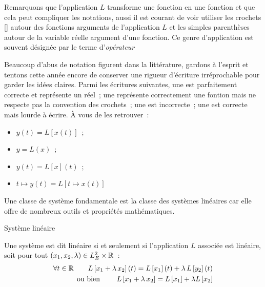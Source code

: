 	\begin{remarque}{}
          Remarquons que l'application $L$ transforme une fonction en
          une fonction et que cela peut compliquer les notations,
          aussi il est courant de voir utiliser les crochets [] autour
          des fonctions arguments de l'application $L$ et les simples
          parenthèses autour de la variable réelle argument d'une
          fonction. Ce genre d'application est souvent désignée par le
          terme d'\emph{opérateur}

        
          Beaucoup d'abus de notation figurent dans la littérature,
          gardons à l'esprit et tentons cette année encore de
          conserver une rigueur d'écriture irréprochable pour garder
          les idées claires. Parmi les écritures suivantes, une est
          parfaitement correcte et représente un réel~; une représente
          correctement une fontion mais ne respecte pas la convention
          des crochets~; une est incorrecte~; une est correcte mais
          lourde à écrire. À vous de les retrouver~:
          \begin{itemize}
          \item $y(t) = L[x(t)]$~;
          \item $y = L(x)$~;
          \item $y(t) = L[x](t)$~;
          \item $t\mapsto y(t) = L[t\mapsto x(t)]$
          \end{itemize}{}
	\end{remarque}
	
	Une classe de système fondamentale est la classe des systèmes
        linéaires car elle offre de nombreux outils et propriétés
        mathématiques.
	\begin{definition}{Système linéaire}
          \label{def:linearite}
          
          Une système est dit linéaire si et seulement si
          l'application $L$ associée est linéaire, soit pour tout
          $\left(x_1,x_2,\lambda\right) \in L_E^2 \times \mathbb{R}$~:
          \begin{eqnarray}
            \label{eq:def_linearite}
	    \forall t \in \mathbb{R} \qquad L\left[x_1 + \lambda\, x_2\right](t) = L\left[x_1\right](t) + \lambda\,L\left[y_2\right](t) \nonumber\\
	    \text{ou bien } \qquad L\left[x_1 + \lambda\,x_2\right] = L\left[x_1\right] +\lambda L\left[x_2 \right]
          \end{eqnarray}
	\end{definition}
	

